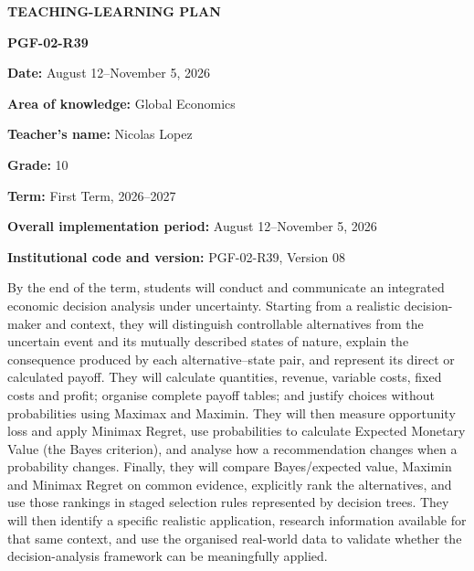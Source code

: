 \documentclass[10pt,letterpaper]{article}
\newcommand{\labelled}[2]{\textbf{#1:} #2\par}
\newcommand{\plansection}[1]{\Needspace{8\baselineskip}\par\vspace{8pt}{\large\bfseries #1\par}\vspace{3pt}}
\newcommand{\plansubsection}[1]{\Needspace{7\baselineskip}\par\vspace{5pt}{\normalsize\bfseries #1\par}\vspace{1pt}}
\begin{document}
\vspace*{-0.25in}
\begin{center}
  {\large\bfseries TEACHING-LEARNING PLAN}\par
  \vspace{2pt}
  \textbf{PGF-02-R39}\par
  \textbf{Date:} August 12--November 5, 2026
\end{center}

\plansection{1. Identification}

\labelled{Area of knowledge}{Global Economics}
\labelled{Teacher's name}{Nicolas Lopez}
\labelled{Grade}{10}
\labelled{Term}{First Term, 2026--2027}
\labelled{Overall implementation period}{August 12--November 5, 2026}
\labelled{Institutional code and version}{PGF-02-R39, Version 08}

\plansection{2. Learning Objective}

By the end of the term, students will conduct and communicate an integrated
economic decision analysis under uncertainty. Starting from a realistic
decision-maker and context, they will distinguish controllable alternatives
from the uncertain event and its mutually described states of nature, explain
the consequence produced by each alternative--state pair, and represent its
direct or calculated payoff. They will calculate quantities, revenue, variable
costs, fixed costs and profit; organise complete payoff tables; and justify
choices without probabilities using Maximax and Maximin. They will then measure
opportunity loss and apply Minimax Regret, use probabilities to calculate
Expected Monetary Value (the Bayes criterion), and analyse how a recommendation
changes when a probability changes. Finally, they will compare Bayes/expected
value, Maximin and Minimax Regret on common evidence, explicitly rank the
alternatives, and use those rankings in staged selection rules represented by
decision trees. They will then identify a specific realistic application,
research information available for that same context, and use the organised
real-world data to validate whether the decision-analysis framework can be
meaningfully applied.

\plansubsection{Assessment Criteria}
\end{document}
